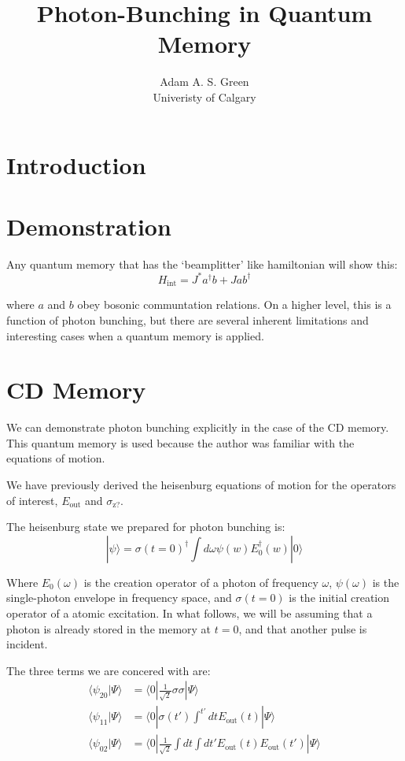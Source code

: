 \documentclass[12pt]{article}
\title{Photon-Bunching in Quantum Memory}
\author{Adam A. S. Green\\Univeristy of Calgary}
\begin{document}

\maketitle
\section{Introduction}
\doublespacing
\section{Demonstration}

Any quantum memory that has the `beamplitter' like hamiltonian will show this:
\begin{equation}
H_{\textrm{int}}= J^* a^\dagger b + J a b^\dagger
\end{equation}

where $a$ and $b$ obey bosonic communtation relations. On a higher level, this is a function of photon bunching, but there are several inherent limitations and interesting cases when a quantum memory is applied.

\section{CD Memory}
We can demonstrate photon bunching explicitly in the case of the CD memory\cite{arxiv}. This quantum memory is used because the author was familiar with the equations of motion.

We have previously derived the heisenburg equations of motion for the operators of interest, $E_{\textrm{out}}$ and $\sigma_{\textrm{z?}}$.

The heisenburg state we prepared for photon bunching is:
\begin{equation}
| \psi \rangle = \sigma(t=0)^\dagger \int d\omega \psi(w) E_0^\dagger(w) | 0 \rangle
\end{equation}

Where $E_0(\omega)$ is the creation operator of a photon of frequency $\omega$, $\psi(\omega)$ is the single-photon envelope in frequency space, and $\sigma(t=0)$ is the initial creation operator of a atomic excitation. In what follows, we will be assuming that a photon is already stored in the memory at $t=0$, and that another pulse is incident.

The three terms we are concered with are:
\begin{align}
\langle \psi_{20}| \Psi \rangle &=\langle 0 | \frac{1}{\sqrt{2}}\sigma \sigma | \Psi \rangle\\
\langle \psi_{11} | \Psi \rangle& =\langle 0 |  \sigma(t') \int^{t'} dt E_\textrm{out}(t) | \Psi \rangle\\
\langle \psi_{02} | \Psi \rangle &= \langle 0 |  \frac{1}{\sqrt{2}}\int dt \int dt' E_\textrm{out}(t) E_\textrm{out}(t') | \Psi \rangle
\end{align}
\end{document}

